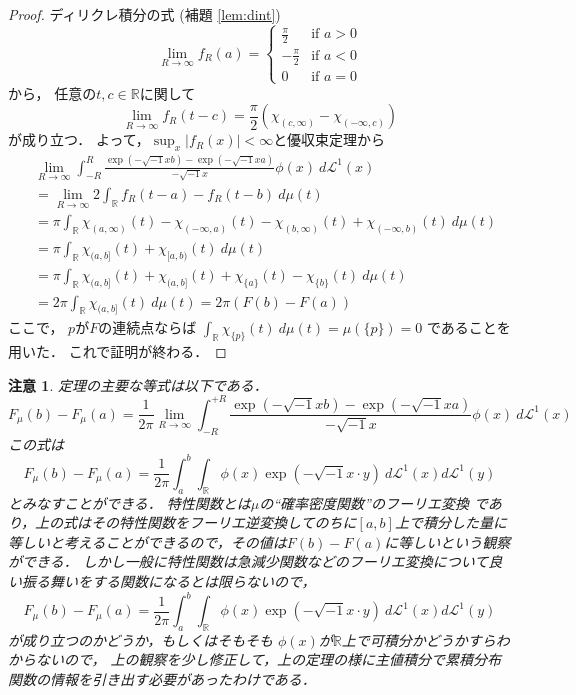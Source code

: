 \documentclass[leqno, 12pt]{jsarticle}
\newtheorem*{rmk}{注意}
\newcommand{\rr}{\mathbb{R}}
\begin{document}
\begin{proof}
ディリクレ積分の式 (補題 \ref{lem:dint})
\[
\lim_{R\to \infty}f_R(a)=
	\begin{cases}
		\frac{\pi}{2} & \text{if $a>0$}\\
		-\frac{\pi}{2} & \text{if $a<0$}\\
		0 & \text{if $a=0$}
	\end{cases}
\]
から，
任意の$t, c\in \rr$に関して
\[
\lim_{R\to \infty}f_{R}(t-c)
=\frac{\pi}{2}\left(\chi_{(c, \infty)}-\chi_{(-\infty, c)}\right)
\]
が成り立つ．
よって，$\sup_{x}|f_R(x)|<\infty$と優収束定理から
\begin{align*}
	&\lim_{R\to \infty}
	\int_{-R}^{R}
	\frac{\exp(-\sqrt{-1}xb)-\exp(-\sqrt{-1}xa)}{-\sqrt{-1}x}
	\phi(x)\ 
	d\mathcal{L}^1(x)
	\\
	&=
	\lim_{R\to \infty}2\int_{\rr}f_R(t-a)-f_R(t-b)\ d\mu(t)
	\\
	&=\pi\int_{\rr}
	\chi_{(a, \infty)}(t)-\chi_{(-\infty, a)}(t)
	-
	\chi_{(b, \infty)}(t)+\chi_{(-\infty, b)}(t)\ d\mu(t)
	\\
	&=
	\pi\int_{\rr}
	\chi_{(a, b]}(t)+\chi_{[a, b)}(t)\ d\mu(t)\\
	&=
	\pi\int_{\rr}
	\chi_{(a, b]}(t)+\chi_{(a, b]}(t)+\chi_{\{a\}}(t)-\chi_{\{b\}}(t)\ d\mu(t)
	\\
	&=
	2\pi\int_{\rr}\chi_{(a, b]}(t)\ d\mu(t)
	=2\pi(F(b)-F(a))
\end{align*}
ここで，
$p$が$F$の連続点ならば
$\int_{\rr}\chi_{\{p\}}(t)\ d\mu(t)=\mu(\{p\})=0$
であることを用いた．
これで証明が終わる．
\end{proof}
\begin{rmk}
定理の主要な等式は以下である．
\[
	F_{\mu}(b)-F_{\mu}(a)=
	\frac{1}{2\pi}
	\lim_{R\to \infty}
	\int_{-R}^{+R}
	\frac{\exp(-\sqrt{-1}xb)-\exp(-\sqrt{-1}xa)}{-\sqrt{-1}x}
	\phi(x)\ 
	d\mathcal{L}^1(x)
\]
この式は
\[
	F_{\mu}(b)-F_{\mu}(a)
	=
	\frac{1}{2\pi}
	\int_{a}^{b}
	\int_{\rr}
	\phi(x)\exp(-\sqrt{-1} x\cdot y)
	\ d\mathcal{L}^1(x)d\mathcal{L}^{1}(y)
\]
とみなすことができる．
特性関数とは$\mu$の``確率密度関数''のフーリエ変換
であり，上の式はその特性関数をフーリエ逆変換してのちに$[a, b]$上で積分した量に等しいと考えることができるので，その値は$F(b)-F(a)$に等しいという観察ができる．
しかし一般に特性関数は急減少関数などのフーリエ変換について良い振る舞いをする関数になるとは限らないので，
\[
	F_{\mu}(b)-F_{\mu}(a)
	=
	\frac{1}{2\pi}
	\int_{a}^{b}
	\int_{\rr}
	\phi(x)\exp(-\sqrt{-1} x\cdot y)
	\ d\mathcal{L}^1(x)d\mathcal{L}^{1}(y)
\]
が成り立つのかどうか，もしくはそもそも
$\phi(x)$が$\rr$上で可積分かどうかすらわからないので，
上の観察を少し修正して，上の定理の様に主値積分で累積分布関数の情報を引き出す必要があったわけである．
\end{rmk}
\end{document}
